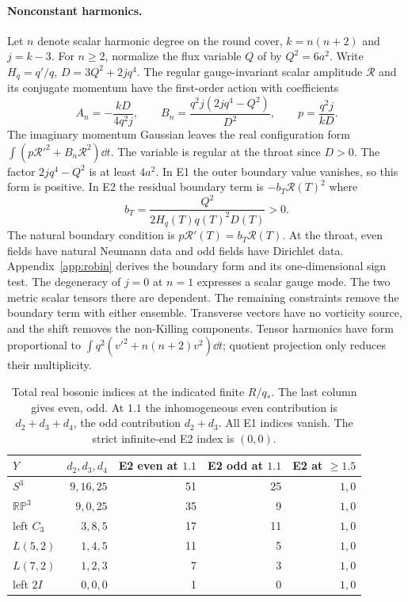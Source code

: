 \paragraph{Nonconstant harmonics.}
Let $n$ denote scalar harmonic degree on the round cover, $k=n(n+2)$ and $j=k-3$. For $n\ge2$, normalize the flux variable $Q$ of \cite{MM} by $Q^2=6a^2$. Write $H_q=q'/q$, $D=3Q^2+2jq^4$. The regular gauge-invariant scalar amplitude $\mathcal R$ and its conjugate momentum have the first-order action with coefficients
\begin{equation}
 A_n=-\frac{kD}{4q^2j},\qquad
 B_n=\frac{q^2j(2jq^4-Q^2)}{D^2},\qquad p=\frac{q^2j}{kD}.
 \label{eq:weights}
\end{equation}
The imaginary momentum Gaussian leaves the real configuration form $\int(p\mathcal R'^2+B_n\mathcal R^2)\dd t$. The variable is regular at the throat since $D>0$. The factor $2jq^4-Q^2$ is at least $4a^2$. In E1 the outer boundary value vanishes, so this form is positive. In E2 the residual boundary term is $-b_T\mathcal R(T)^2$ where
\begin{equation}
 b_T=\frac{Q^2}{2 H_q(T) q(T)^2D(T)} > 0 .
 \label{eq:robin}
\end{equation}
The natural boundary condition is $p\mathcal R'(T)=b_T\mathcal R(T)$. At the throat, even fields have natural Neumann data and odd fields have Dirichlet data. Appendix~\ref{app:robin} derives the boundary form and its one-dimensional sign test. The degeneracy of $j=0$ at $n=1$ expresses a scalar gauge mode. The two metric scalar tensors there are dependent. The remaining constraints remove the boundary term with either ensemble. Transverse vectors have no vorticity source, and the shift removes the non-Killing components. Tensor harmonics have form proportional to $\int q^2(v'^2+n(n+2)v^2)\dd t$; quotient projection only reduces their multiplicity.

\begin{table}[htbp]\centering
\begin{tabular}{lrrrr}
\toprule
$Y$ & $d_2,d_3,d_4$ & E2 even at $1.1$ & E2 odd at $1.1$ & E2 at $\ge1.5$\\
\midrule
$S^3$ & $9,16,25$ & 51 & 25 & $1,0$\\
$\mathbb{RP}^3$ & $9,0,25$ & 35 & 9 & $1,0$\\
left $C_3$ & $3,8,5$ & 17 & 11 & $1,0$\\
$L(5,2)$ & $1,4,5$ & 11 & 5 & $1,0$\\
$L(7,2)$ & $1,2,3$ & 7 & 3 & $1,0$\\
left $2I$ & $0,0,0$ & 1 & 0 & $1,0$\\
\bottomrule
\end{tabular}
\caption{Total real bosonic indices at the indicated finite $R/q_*$. The last column gives even, odd. At $1.1$ the inhomogeneous even contribution is $d_2+d_3+d_4$, the odd contribution $d_2+d_3$. All E1 indices vanish. The strict infinite-end E2 index is $(0,0)$.}
\label{tab:morse}
\end{table}

